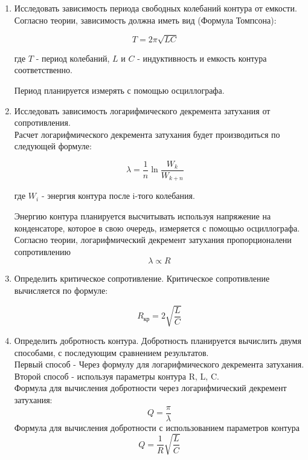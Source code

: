 \documentclass[a4paper, 12pt]{article}%
\begin{document}
\begin{enumerate}
    \item Исследовать зависимость периода свободных колебаний контура от емкости. Согласно теории, зависимость должна иметь вид (Формула Томпсона):

\begin{equation}
    T = 2\pi \sqrt{LC} \quad
\end{equation}
    

    где $T$ - период колебаний, $L$ и $C$ - индуктивность и емкость контура соответственно.

    Период планируется измерять с помощью осциллографа.

    \item Исследовать зависимость логарифмического декремента затухания от сопротивления. \\ Расчет логарифмического декремента затухания будет производиться по следующей формуле:

\begin{equation}
	\lambda = \frac{1}{n} \ln\frac{W_k}{W_{k+n}} \quad    
\end{equation}
    

    где $W_i$ - энергия контура после i-того колебания.

    Энергию контура планируется высчитывать используя напряжение на конденсаторе, которое в свою очередь, измеряется с помощью осциллографа. \\

    
Согласно теории, логарифмический декремент затухания пропорционалени сопротивлению
\begin{equation}
	\lambda \propto R
\end{equation}
    
    \newpage

    \item Определить критическое сопротивление. Критическое сопротивление вычисляется по формуле:

\begin{equation}
	R_\text{кр} = 2\sqrt{\frac{L}{C}}
\end{equation}
   

    \item Определить добротность контура. Добротность планируется вычислить двумя способами, с последующим сравнением результатов. \\

    Первый способ - Через формулу для логарифмического декремента затухания. \\
    Второй способ - используя параметры контура R, L, C. \\[0.1cm]

    Формула для вычисления добротности через логарифмический декремент затухания:
\begin{equation}
	Q = \frac{\pi}{\lambda}
\end{equation}
    Формула для вычисления добротности с использованием параметров контура
\begin{equation}
 	Q = \frac{1}{R} \sqrt{\frac{L}{C}}
\end{equation}

\end{enumerate}
\end{document}
